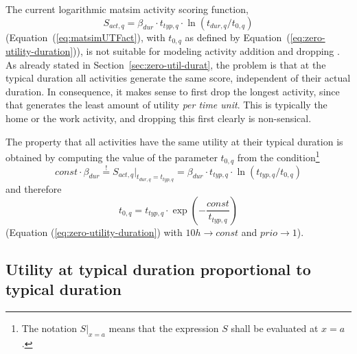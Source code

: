 The current logarithmic \gls{matsim} activity scoring function,
\[
S_{act,q} = \beta_{dur} \cdot t_{typ,q} \cdot \ln(t_{dur,q}/t_{0,q}) 
\]
(\cf Equation~(\ref{eq:matsimUTFact}), with $t_{0,q}$ as defined by Equation~(\ref{eq:zero-utility-duration})), is not suitable for modeling activity
addition and dropping \citep[][p.127f]{Feil_PhDThesis_2010}. %
%
As already stated in Section~\ref{sec:zero-util-durat}, the problem is that 
at the typical duration all activities generate the same score, independent of their actual duration.  In consequence, it makes sense to first drop the longest activity, since that generates the least amount of utility \emph{per time unit}. This is typically the home or the work activity, and dropping this first clearly is non-sensical.

The property that all activities have the same utility at their typical duration is obtained by computing the value of the parameter $t_{0,q}$ from the condition\footnote{%
%
The notation $S \Big|_{x=a}$ means that the expression $S$ shall be evaluated at $x=a$.
%
}
\begin{equation}
const \cdot \beta_{dur} \stackrel!= S_{act,q} \Big|_{t_{dur,q} = t_{typ,q}}
=
\beta_{dur} \cdot t_{typ,q} \cdot \ln(t_{typ,q}/t_{0,q}) 
\label{eq:7}
\end{equation}
and therefore
\begin{equation}
t_{0,q} = t_{typ,q} \cdot \exp\left( - \frac{const}{t_{typ,q}} \right)
\label{eq:8}
\end{equation}
(\cf Equation (\ref{eq:zero-utility-duration}) with $10h \to const$ and $prio \to 1$). 

\subsection{Utility at typical duration proportional to typical duration}


